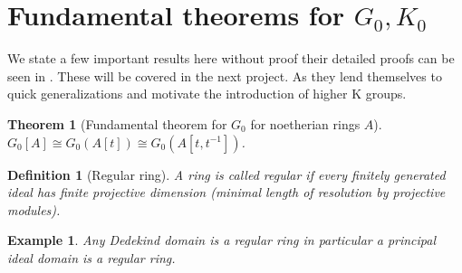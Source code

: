 \documentclass[12pt]{report}
\numberwithin{equation}{section}
\newcounter{dummy} \numberwithin{dummy}{section}
\newtheorem{theorem}[dummy]{Theorem}
\newtheorem{definition}[dummy]{Definition}
\newtheorem{example}[dummy]{Example}
\begin{document}
	\section{Fundamental theorems for $G_0, K_0$}
	We state a few important results here without proof their detailed proofs can be seen in \cite{weibel2013k}. These will be covered in the next project. As they lend themselves to quick generalizations and motivate the introduction of higher K groups.
	\begin{theorem}[Fundamental theorem for $G_0$ for noetherian rings $A$]\label{g0fund}
		$G_0[A] \cong G_0(A[t]) \cong G_0(A[t,t^{-1}])$.
	\end{theorem}
%
%		
	
	
	\begin{definition}[Regular ring] A ring is called regular if every finitely generated ideal has finite projective dimension (minimal length of resolution by projective modules).
	\end{definition}
	\begin{example}
		Any Dedekind domain is a regular ring in particular a principal ideal domain is a regular ring.
	\end{example}
\end{document}
